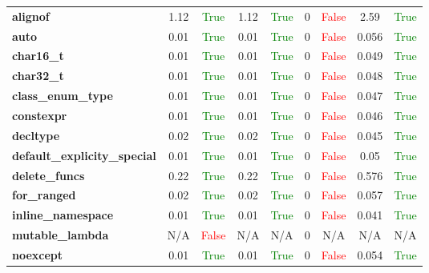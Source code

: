 \documentclass{article}
\begin{document}
\begin{xltabular}{\textwidth}{lcccccccc}
\textbf{{\fontsize{10}{12}\selectfont alignof}}& 1.12&\textcolor{green}{True}& 1.12&\textcolor{green}{True}& 0&\textcolor{red}{False}& 2.59&\textcolor{green}{True} \\[0.5ex]
\textbf{{\fontsize{10}{12}\selectfont auto}}& 0.01&\textcolor{green}{True}& 0.01&\textcolor{green}{True}& 0&\textcolor{red}{False}& 0.056&\textcolor{green}{True} \\[0.5ex]
\textbf{{\fontsize{10}{12}\selectfont char16\_t}}& 0.01&\textcolor{green}{True}& 0.01&\textcolor{green}{True}& 0&\textcolor{red}{False}& 0.049&\textcolor{green}{True} \\[0.5ex]
\textbf{{\fontsize{10}{12}\selectfont char32\_t}}& 0.01&\textcolor{green}{True}& 0.01&\textcolor{green}{True}& 0&\textcolor{red}{False}& 0.048&\textcolor{green}{True} \\[0.5ex]
\textbf{{\fontsize{10}{12}\selectfont class\_enum\_type}}& 0.01&\textcolor{green}{True}& 0.01&\textcolor{green}{True}& 0&\textcolor{red}{False}& 0.047&\textcolor{green}{True} \\[0.5ex]
\textbf{{\fontsize{10}{12}\selectfont constexpr}}& 0.01&\textcolor{green}{True}& 0.01&\textcolor{green}{True}& 0&\textcolor{red}{False}& 0.046&\textcolor{green}{True} \\[0.5ex]
\textbf{{\fontsize{10}{12}\selectfont decltype}}& 0.02&\textcolor{green}{True}& 0.02&\textcolor{green}{True}& 0&\textcolor{red}{False}& 0.045&\textcolor{green}{True} \\[0.5ex]
\textbf{{\fontsize{10}{12}\selectfont default\_explicity\_special}}& 0.01&\textcolor{green}{True}& 0.01&\textcolor{green}{True}& 0&\textcolor{red}{False}& 0.05&\textcolor{green}{True} \\[0.5ex]
\textbf{{\fontsize{10}{12}\selectfont delete\_funcs}}& 0.22&\textcolor{green}{True}& 0.22&\textcolor{green}{True}& 0&\textcolor{red}{False}& 0.576&\textcolor{green}{True} \\[0.5ex]
\textbf{{\fontsize{10}{12}\selectfont for\_ranged}}& 0.02&\textcolor{green}{True}& 0.02&\textcolor{green}{True}& 0&\textcolor{red}{False}& 0.057&\textcolor{green}{True} \\[0.5ex]
\textbf{{\fontsize{10}{12}\selectfont inline\_namespace}}& 0.01&\textcolor{green}{True}& 0.01&\textcolor{green}{True}& 0&\textcolor{red}{False}& 0.041&\textcolor{green}{True} \\[0.5ex]
\textbf{{\fontsize{10}{12}\selectfont mutable\_lambda}}& N/A&\textcolor{red}{False}& N/A&N/A& 0&N/A& N/A&N/A \\[0.5ex]
\textbf{{\fontsize{10}{12}\selectfont noexcept}}& 0.01&\textcolor{green}{True}& 0.01&\textcolor{green}{True}& 0&\textcolor{red}{False}& 0.054&\textcolor{green}{True} \\[0.5ex]

\end{xltabular}
\end{document}
